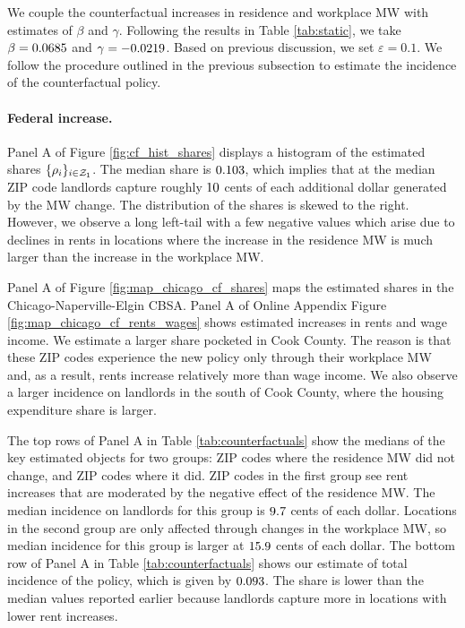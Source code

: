 We couple the counterfactual increases in residence and workplace MW with 
estimates of $\beta$ and $\gamma$.
Following the results in Table \ref{tab:static}, we take 
$\beta = 0.0685$ and 
$\gamma = -0.0219$.
Based on previous discussion, we set $\varepsilon = 0.1$.
We follow the procedure outlined in the previous subsection to estimate the 
incidence of the counterfactual policy.

\paragraph{Federal increase.}

Panel A of Figure \ref{fig:cf_hist_shares} displays a histogram of the
estimated shares $\{\rho_i\}_{i\in\mathcal{Z}_1}$.
The median share is $\textnormal{0.103}$, which implies that at the median 
ZIP code landlords capture roughly $\textnormal{10}$ cents of each 
additional dollar generated by the MW change.
The distribution of the shares is skewed to the right.
However, we observe a long left-tail with a few negative values which arise due 
to declines in rents in locations where the increase in the residence MW is much 
larger than the increase in the workplace MW.

Panel A of Figure \ref{fig:map_chicago_cf_shares} maps the estimated shares 
in the Chicago-Naperville-Elgin CBSA.
Panel A of Online Appendix Figure \ref{fig:map_chicago_cf_rents_wages} shows
estimated increases in rents and wage income.
We estimate a larger share pocketed in Cook County.
The reason is that these ZIP codes experience the new policy only through
their workplace MW and, as a result, rents increase relatively more than
wage income.
We also observe a larger incidence on landlords in the south of Cook County,
where the housing expenditure share is larger.

The top rows of Panel A in Table \ref{tab:counterfactuals} show the medians of 
the key estimated objects for two groups:
ZIP codes where the residence MW did not change, and 
ZIP codes where it did.
ZIP codes in the first group see rent increases that are moderated by the 
negative effect of the residence MW.
The median incidence on landlords for this group is $\textnormal{9.7}$ 
cents of each dollar.
Locations in the second group are only affected through changes in the 
workplace MW, so median incidence for this group is larger at 
$\textnormal{15.9}$ cents of each dollar.
The bottom row of Panel A in Table \ref{tab:counterfactuals} shows our estimate
of total incidence of the policy, which is given by $\textnormal{0.093}$.
The share is lower than the median values reported earlier because landlords 
capture more in locations with lower rent increases.

